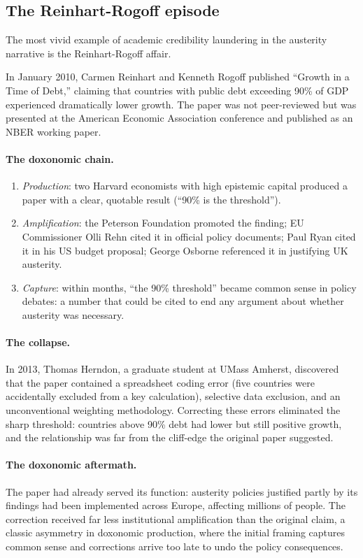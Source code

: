 \subsection{The Reinhart-Rogoff episode}

The most vivid example of academic credibility laundering in the austerity narrative is the Reinhart-Rogoff affair.

\begin{example}
\label{ex:reinhart-rogoff}
In January 2010, Carmen Reinhart and Kenneth Rogoff published ``Growth in a Time of Debt,'' claiming that countries with public debt exceeding 90\% of GDP experienced dramatically lower growth.
The paper was not peer-reviewed but was presented at the American Economic Association conference and published as an NBER working paper.

\paragraph{The doxonomic chain.}
\begin{enumerate}[nosep]
  \item \emph{Production}: two Harvard economists with high epistemic capital produced a paper with a clear, quotable result (``90\% is the threshold'').
  \item \emph{Amplification}: the Peterson Foundation promoted the finding; EU Commissioner Olli Rehn cited it in official policy documents; Paul Ryan cited it in his US budget proposal; George Osborne referenced it in justifying UK austerity.
  \item \emph{Capture}: within months, ``the 90\% threshold'' became common sense in policy debates: a number that could be cited to end any argument about whether austerity was necessary.
\end{enumerate}

\paragraph{The collapse.}
In 2013, Thomas Herndon, a graduate student at UMass Amherst, discovered that the paper contained a spreadsheet coding error (five countries were accidentally excluded from a key calculation), selective data exclusion, and an unconventional weighting methodology.
Correcting these errors eliminated the sharp threshold: countries above 90\% debt had lower but still positive growth, and the relationship was far from the cliff-edge the original paper suggested.

\paragraph{The doxonomic aftermath.}
The paper had already served its function: austerity policies justified partly by its findings had been implemented across Europe, affecting millions of people.
The correction received far less institutional amplification than the original claim, a classic asymmetry in doxonomic production, where the initial framing captures common sense and corrections arrive too late to undo the policy consequences.
\end{example}

